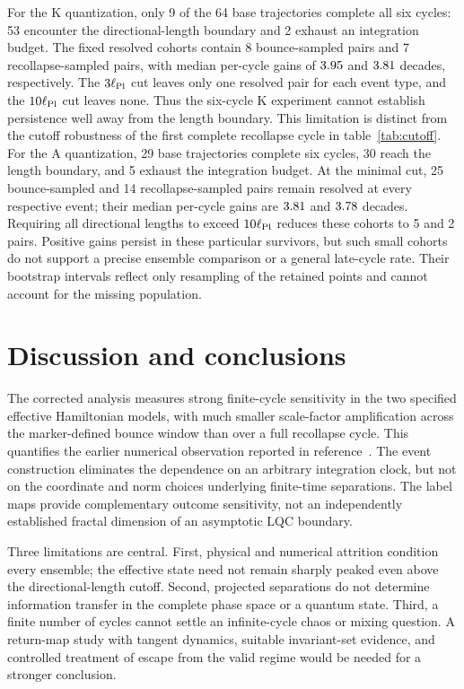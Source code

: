 \documentclass[12pt]{iopjournal}
\begin{document}
For the K quantization, only 9 of the 64 base trajectories complete all six cycles: 53 encounter
the directional-length boundary and 2 exhaust an integration budget. The fixed resolved cohorts
contain 8 bounce-sampled pairs and 7 recollapse-sampled pairs, with median per-cycle gains of
$3.95$ and $3.81$ decades, respectively. The $3\ell_{\rm Pl}$ cut leaves only one resolved
pair for each event type, and the $10\ell_{\rm Pl}$ cut leaves none. Thus the six-cycle K experiment
cannot establish persistence well away from the length boundary. This limitation is distinct from
the cutoff robustness of the first complete recollapse cycle in table~\ref{tab:cutoff}.
For the A quantization, 29 base trajectories complete six cycles, 30 reach the length boundary, and
5 exhaust the integration budget. At the minimal cut, 25 bounce-sampled and 14 recollapse-sampled
pairs remain resolved at every respective event; their median per-cycle gains are $3.81$ and
$3.78$ decades. Requiring all directional lengths to exceed $10\ell_{\rm Pl}$ reduces these
cohorts to 5 and 2 pairs. Positive gains persist in these particular survivors, but such small
cohorts do not support a precise ensemble comparison or a general late-cycle rate. Their bootstrap
intervals reflect only resampling of the retained points and cannot account for the missing population.

\section{Discussion and conclusions}
The corrected analysis measures strong finite-cycle sensitivity in the two specified effective
Hamiltonian models, with much smaller scale-factor amplification across the marker-defined bounce
window than over a full recollapse cycle. This quantifies the earlier numerical observation reported in reference~\cite{BlackmoreWilsonEwing2023}. The event construction eliminates the dependence on an arbitrary integration clock, but not on the coordinate and norm choices underlying finite-time separations. The label maps provide complementary outcome sensitivity, not an independently
established fractal dimension of an asymptotic LQC boundary.

Three limitations are central. First, physical and numerical attrition condition every ensemble;
the effective state need not remain sharply peaked even above the directional-length cutoff.
Second, projected separations do not determine information transfer in the complete phase space
or a quantum state. Third, a finite number of cycles cannot settle an infinite-cycle chaos or
mixing question. A return-map study with tangent dynamics, suitable invariant-set evidence, and
controlled treatment of escape from the valid regime would be needed for a stronger conclusion.
\end{document}
